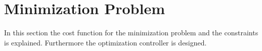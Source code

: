 \section{Minimization Problem}

In this section the cost function for the minimization problem and the constraints is explained. Furthermore the optimization controller is designed. 


